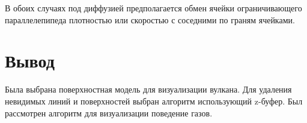 В обоих случаях под диффузией предполагается обмен ячейки ограничивающего параллелепипеда плотностью или скоростью с соседними по граням ячейками.  

\section*{Вывод}
Была выбрана поверхностная модель для визуализации вулкана. Для удаления невидимых линий и поверхностей выбран алгоритм использующий z-буфер. Был рассмотрен алгоритм для визуализации поведение газов.
